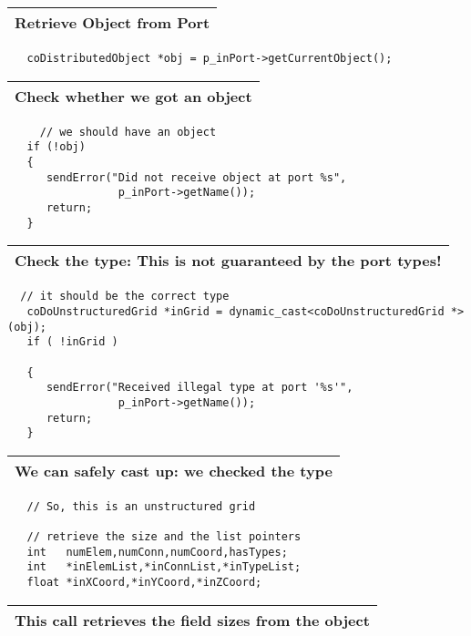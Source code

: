 \begin{longtable}{|l|}
\hline
   {\bf Retrieve Object from Port} \\
\hline
\end{longtable}
   
\begin{verbatim}   
   coDistributedObject *obj = p_inPort->getCurrentObject();
\end{verbatim}

\begin{longtable}{|l|}
\hline
   {\bf Check whether we got an object} \\
\hline
\end{longtable}

\begin{verbatim}
     // we should have an object
   if (!obj)  
   {
      sendError("Did not receive object at port %s",
                 p_inPort->getName());
      return;
   }
\end{verbatim}

\begin{longtable}{|l|}
\hline
   {\bf Check the type: This is not guaranteed by the port types!} \\
\hline
\end{longtable}

\begin{verbatim}  
  // it should be the correct type
   coDoUnstructuredGrid *inGrid = dynamic_cast<coDoUnstructuredGrid *>(obj);
   if ( !inGrid )
     
   {
      sendError("Received illegal type at port '%s'",
                 p_inPort->getName());
      return;
   }
\end{verbatim}

\begin{longtable}{|l|}
\hline
   {\bf We can safely cast up: we checked the type} \\
\hline
\end{longtable}

\begin{verbatim} 
   // So, this is an unstructured grid
    
   // retrieve the size and the list pointers
   int   numElem,numConn,numCoord,hasTypes;
   int   *inElemList,*inConnList,*inTypeList;
   float *inXCoord,*inYCoord,*inZCoord;
\end{verbatim}

\begin{longtable}{|l|}
\hline
   {\bf This call retrieves the field sizes from the object} \\
\hline
\end{longtable}
                                                             
